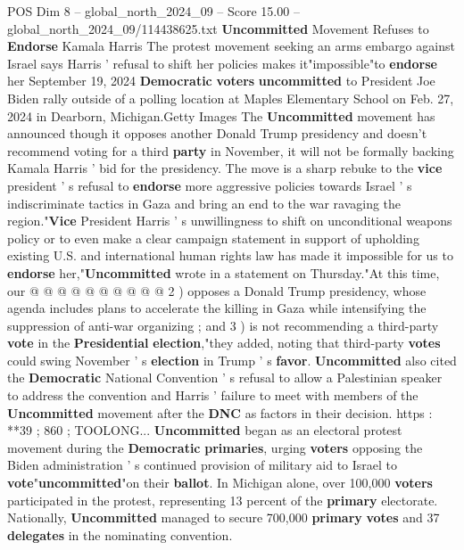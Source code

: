 \begin{textsample}{POS Dim 8 – global\_north\_2024\_09 – Score 15.00 – global\_north\_2024\_09/114438625.txt}  \label{ex:f8_pos_083}
\textbf{Uncommitted} Movement Refuses to \textbf{Endorse} Kamala Harris The protest movement seeking an arms embargo against Israel says Harris ' refusal to shift her policies makes it"impossible"to \textbf{endorse} her September 19, 2024 \textbf{Democratic} \textbf{voters} \textbf{uncommitted} to President Joe Biden rally outside of a polling location at Maples Elementary School on Feb. 27, 2024 in Dearborn, Michigan.Getty Images The \textbf{Uncommitted} movement has announced though it opposes another Donald Trump presidency and doesn't recommend voting for a third \textbf{party} in November, it will not be formally backing Kamala Harris ' bid for the presidency.
The move is a sharp rebuke to the \textbf{vice} president ' s refusal to \textbf{endorse} more aggressive policies towards Israel ' s indiscriminate tactics in Gaza and bring an end to the war ravaging the region."\textbf{Vice} President Harris ' s unwillingness to shift on unconditional weapons policy or to even make a clear campaign statement in support of upholding existing U.S. and international human rights law has made it impossible for us to \textbf{endorse} her,"\textbf{Uncommitted} wrote in a statement on Thursday."At this time, our @ @ @ @ @ @ @ @ @ @ 2 ) opposes a Donald Trump presidency, whose agenda includes plans to accelerate the killing in Gaza while intensifying the suppression of anti-war organizing ; and 3 ) is not recommending a third-party \textbf{vote} in the \textbf{Presidential} \textbf{election},"they added, noting that third-party \textbf{votes} could swing November ' s \textbf{election} in Trump ' s \textbf{favor}. \textbf{Uncommitted} also cited the \textbf{Democratic} National Convention ' s refusal to allow a Palestinian speaker to address the convention and Harris ' failure to meet with members of the \textbf{Uncommitted} movement after the \textbf{DNC} as factors in their decision. https : **39 ; 860 ; TOOLONG... \textbf{Uncommitted} began as an electoral protest movement during the \textbf{Democratic} \textbf{primaries}, urging \textbf{voters} opposing the Biden administration ' s continued provision of military aid to Israel to \textbf{vote}"\textbf{uncommitted}"on their \textbf{ballot}.
In Michigan alone, over 100,000 \textbf{voters} participated in the protest, representing 13 percent of the \textbf{primary} electorate.
Nationally, \textbf{Uncommitted} managed to secure 700,000 \textbf{primary} \textbf{votes} and 37 \textbf{delegates} in the nominating convention.

\end{textsample}
